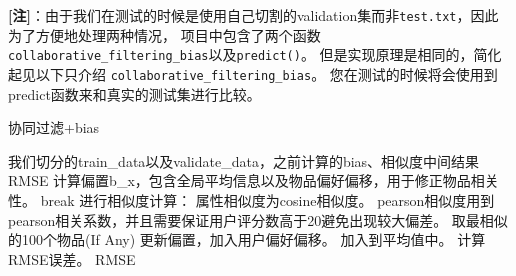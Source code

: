 \textbf{[注]}：由于我们在测试的时候是使用自己切割的validation集而非\texttt{test.txt}，因此为了方便地处理两种情况，
项目中包含了两个函数\texttt{collaborative\_filtering\_bias}以及\texttt{predict()}。
但是实现原理是相同的，简化起见以下只介绍
\texttt{collaborative\_filtering\_bias}。
您在测试的时候将会使用到predict函数来和真实的测试集进行比较。
\begin{breakablealgorithm} 
	\caption{协同过滤+bias} 
	\begin{algorithmic}[1] %
		\Require 我们切分的train\_data以及validate\_data，之前计算的bias、相似度中间结果
		\Ensure RMSE
				\State 计算偏置b\_x，包含全局平均信息以及物品偏好偏移，用于修正物品相关性。
						break
					\Else	\State 进行相似度计算：
							\State 属性相似度为cosine相似度。
							\State pearson相似度用到pearson相关系数，并且需要保证用户评分数高于20避免出现较大偏差。
					\EndIf
				\EndFor
				\State 取最相似的100个物品(If Any)
					\State 更新偏置，加入用户偏好偏移。
					\State 加入到平均值中。
				\EndFor
			\EndFor
			\State 计算RMSE误差。
			\State \Return RMSE
		\EndFunction
	\end{algorithmic}
\end{breakablealgorithm}

